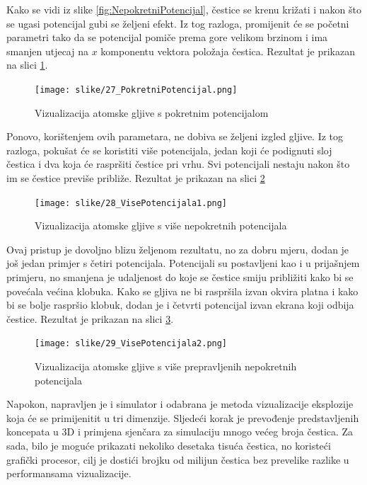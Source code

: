 \documentclass{foi}
\begin{document}
Kako se vidi iz slike \ref{fig:NepokretniPotencijal}, čestice se krenu križati i nakon što se ugasi potencijal gubi se željeni efekt. Iz tog razloga, promijenit će se početni parametri tako da se potencijal pomiče prema gore velikom brzinom i ima smanjen utjecaj na $x$ komponentu vektora položaja čestica. Rezultat je prikazan na slici \ref{fig:PokretniPotencijal}.

\begin{figure}[H]
    \centering
    \texttt{[image: slike/27\_PokretniPotencijal.png]}
    \captionsetup{justification=centering}
    \caption{Vizualizacija atomske gljive s pokretnim potencijalom}
\label{fig:PokretniPotencijal}
\end{figure}

Ponovo, korištenjem ovih parametara, ne dobiva se željeni izgled gljive. Iz tog razloga, pokušat će se koristiti više potencijala, jedan koji će podignuti sloj čestica i dva koja će raspršiti čestice pri vrhu.  Svi potencijali nestaju nakon što im se čestice previše približe. Rezultat je prikazan na slici \ref{fig:VisePotencijala1}

\begin{figure}[H]
    \centering
    \texttt{[image: slike/28\_VisePotencijala1.png]}
    \captionsetup{justification=centering}
    \caption{Vizualizacija atomske gljive s više nepokretnih potencijala}
\label{fig:VisePotencijala1}
\end{figure}

Ovaj pristup je dovoljno blizu željenom rezultatu, no za dobru mjeru, dodan je još jedan primjer s četiri potencijala. Potencijali su postavljeni kao i u prijašnjem primjeru, no smanjena je udaljenost do koje se čestice smiju približiti kako bi se povećala većina klobuka. Kako se gljiva ne bi raspršila izvan okvira platna i kako bi se bolje raspršio klobuk, dodan je i četvrti potencijal izvan ekrana koji odbija čestice. Rezultat je prikazan na slici \ref{fig:VisePotencijala2}.


\begin{figure}[H]
    \centering
    \texttt{[image: slike/29\_VisePotencijala2.png]}
    \captionsetup{justification=centering}
    \caption{Vizualizacija atomske gljive s više prepravljenih nepokretnih potencijala}
\label{fig:VisePotencijala2}
\end{figure}

Napokon, napravljen je i simulator i odabrana je metoda vizualizacije eksplozije koja će se primijenitit u tri dimenzije. Sljedeći korak je prevođenje predstavljenih koncepata u 3D i primjena sjenčara za simulaciju mnogo većeg broja čestica. Za sada, bilo je moguće prikazati nekoliko desetaka tisuća čestica, no koristeći grafički procesor, cilj je dostići brojku od milijun čestica bez prevelike razlike u performansama vizualizacije.
\end{document}
